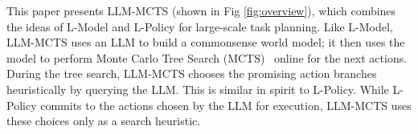 

This paper presents LLM-MCTS (shown in Fig \ref{fig:overview}), which combines the ideas of L-Model and L-Policy
for large-scale task planning. Like L-Model, LLM-MCTS uses an LLM to build a commonsense world model; it then uses the model to perform Monte Carlo Tree Search (MCTS)~\cite{coulom2007efficient} online for the next actions. During the tree search, LLM-MCTS chooses the promising action branches heuristically by querying the LLM. This is similar in spirit to L-Policy. While L-Policy commits to the actions chosen by the LLM for execution, LLM-MCTS uses these choices only as a search heuristic.

